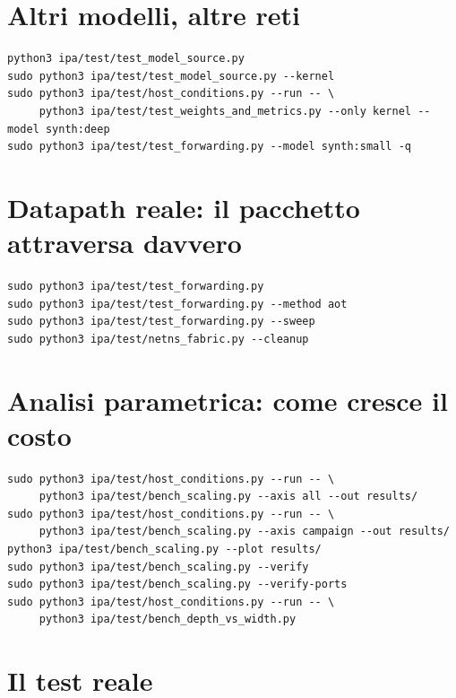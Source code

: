 \documentclass[11pt,a4paper,oneside]{report}
\begin{document}
\section{Altri modelli, altre reti}

\begin{lstlisting}
python3 ipa/test/test_model_source.py
sudo python3 ipa/test/test_model_source.py --kernel
sudo python3 ipa/test/host_conditions.py --run -- \
     python3 ipa/test/test_weights_and_metrics.py --only kernel --model synth:deep
sudo python3 ipa/test/test_forwarding.py --model synth:small -q
\end{lstlisting}

\section{Datapath reale: il pacchetto attraversa davvero}

\begin{lstlisting}
sudo python3 ipa/test/test_forwarding.py
sudo python3 ipa/test/test_forwarding.py --method aot
sudo python3 ipa/test/test_forwarding.py --sweep
sudo python3 ipa/test/netns_fabric.py --cleanup
\end{lstlisting}

\section{Analisi parametrica: come cresce il costo}

\begin{lstlisting}
sudo python3 ipa/test/host_conditions.py --run -- \
     python3 ipa/test/bench_scaling.py --axis all --out results/
sudo python3 ipa/test/host_conditions.py --run -- \
     python3 ipa/test/bench_scaling.py --axis campaign --out results/
python3 ipa/test/bench_scaling.py --plot results/
sudo python3 ipa/test/bench_scaling.py --verify
sudo python3 ipa/test/bench_scaling.py --verify-ports
sudo python3 ipa/test/host_conditions.py --run -- \
     python3 ipa/test/bench_depth_vs_width.py
\end{lstlisting}

\section{Il test reale}
\end{document}
